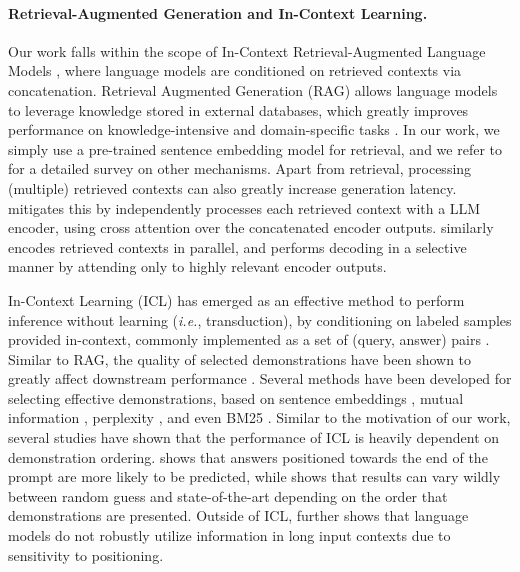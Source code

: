 \paragraph{Retrieval-Augmented Generation and In-Context Learning.}
Our work falls within the scope of In-Context Retrieval-Augmented Language Models \citep{ram2023context}, where language models are conditioned on retrieved contexts via concatenation. Retrieval Augmented Generation (RAG) allows language models to leverage knowledge stored in external databases, which greatly improves performance on knowledge-intensive and domain-specific tasks \citep{lewis2020retrieval}. In our work, we simply use a pre-trained sentence embedding model for retrieval, and we refer to \cite{gao2023retrieval} for a detailed survey on other mechanisms.
Apart from retrieval, processing (multiple) retrieved contexts can also greatly increase generation latency. \cite{izacard2023atlas} mitigates this by independently processes each retrieved context with a LLM encoder, using cross attention over the concatenated encoder outputs. \cite{zhu2024accelerating} similarly encodes retrieved contexts in parallel, and performs decoding in a selective manner by attending only to highly relevant encoder outputs.

In-Context Learning (ICL) \citep{brown2020language} has emerged as an effective method to perform inference without learning (\textit{i.e.}, transduction), by conditioning on labeled samples provided in-context, commonly implemented as a set of (query, answer) pairs \citep{dong2022survey}. 
Similar to RAG, the quality of selected demonstrations have been shown to greatly affect downstream performance \citep{xu2024context}. Several methods have been developed for selecting effective demonstrations, based on sentence embeddings \citep{liu2021makes}, mutual information \citep{sorensen2022information}, perplexity \citep{gonen2022demystifying}, and even BM25 \citep{robertson2009probabilistic}.
Similar to the motivation of our work, several studies have shown that the performance of ICL is heavily dependent on demonstration ordering. \cite{zhao2021calibrate} shows that answers positioned towards the end of the prompt are more likely to be predicted, while \cite{lu2021fantastically} shows that results can vary wildly between random guess and state-of-the-art depending on the order that demonstrations are presented. Outside of ICL, \cite{liu2024lost} further shows that language models do not robustly utilize information in long input contexts due to sensitivity to positioning.



